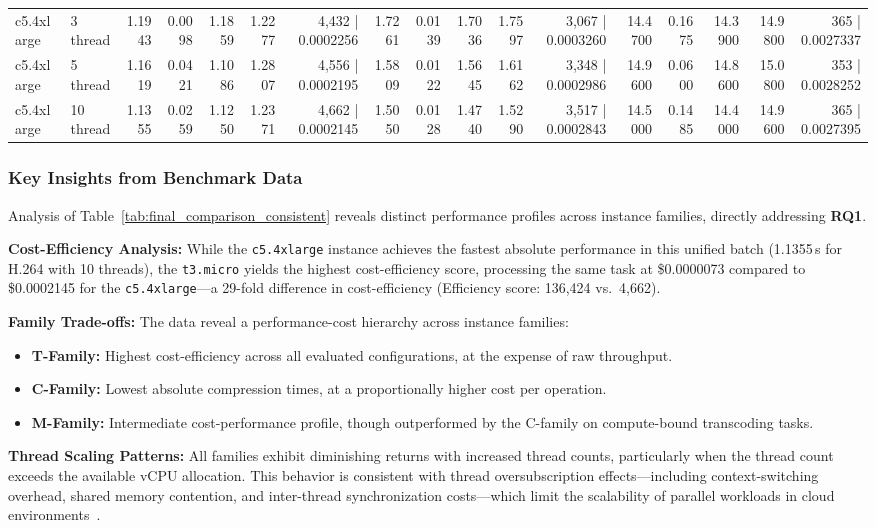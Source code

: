 \documentclass[conference]{IEEEtran}
\begin{document}
\begin{table}[h]
{\begin{tabular}{ll|rrrrr|rrrrr|rrrrr}
			c5.4xlarge & 3 thread & 1.1943 & 0.0098 & 1.1859 & 1.2277 & 4,432 | 0.0002256 & 1.7261 & 0.0139 & 1.7036 & 1.7597 & 3,067 | 0.0003260 & 14.4700 & 0.1675 & 14.3900 & 14.9800 & 365 | 0.0027337 \\
			c5.4xlarge & 5 thread & 1.1619 & 0.0421 & 1.1086 & 1.2807 & 4,556 | 0.0002195 & 1.5809 & 0.0122 & 1.5645 & 1.6162 & 3,348 | 0.0002986 & 14.9600 & 0.0600 & 14.8600 & 15.0800 & 353 | 0.0028252 \\
			c5.4xlarge & 10 thread & 1.1355 & 0.0259 & 1.1250 & 1.2371 & 4,662 | 0.0002145 & 1.5050 & 0.0128 & 1.4740 & 1.5290 & 3,517 | 0.0002843 & 14.5000 & 0.1485 & 14.4000 & 14.9600 & 365 | 0.0027395 \\
			\bottomrule
		\end{tabular}
	}
\end{table}

\subsubsection{Key Insights from Benchmark Data}

Analysis of Table~\ref{tab:final_comparison_consistent} reveals distinct
performance profiles across instance families, directly addressing \textbf{RQ1}.

\textbf{Cost-Efficiency Analysis:} While the \texttt{c5.4xlarge} instance
achieves the fastest absolute performance in this unified batch (1.1355\,s for H.264
with 10 threads), the \texttt{t3.micro} yields the highest cost-efficiency score,
processing the same task at \$0.0000073 compared to \$0.0002145 for the
\texttt{c5.4xlarge}---a 29-fold difference in cost-efficiency (Efficiency
score: 136,424 vs.\ 4,662).

\textbf{Family Trade-offs:} The data reveal a performance-cost hierarchy across
instance families:
\begin{itemize}
	\item \textbf{T-Family:} Highest cost-efficiency across all evaluated
	configurations, at the expense of raw throughput.
	\item \textbf{C-Family:} Lowest absolute compression times, at a
	proportionally higher cost per operation.
	\item \textbf{M-Family:} Intermediate cost-performance profile, though
	outperformed by the C-family on compute-bound transcoding tasks.
\end{itemize}

\textbf{Thread Scaling Patterns:} All families exhibit diminishing returns
with increased thread counts, particularly when the thread count exceeds the
available vCPU allocation. This behavior is consistent with thread
oversubscription effects---including context-switching overhead, shared memory
contention, and inter-thread synchronization costs---which limit the
scalability of parallel workloads in cloud environments~\cite{b1}.
\end{document}
